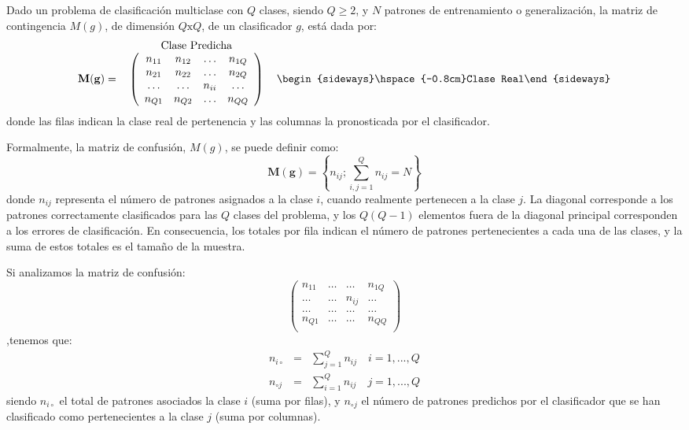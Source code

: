 Dado un problema de
clasificación multiclase con $Q$ clases, siendo $Q\geq2$, y $N$ patrones de entrenamiento
o generalización, la matriz de contingencia $M(g)$, de dimensión $Q\text{x}Q$, de un
clasificador $g$, está dada por:
\begin{displaymath}
\begin{tabular}{ccc}
&Clase Predicha & \\
$\mathbf{M(g)}=$ &$\left( \begin{array}{cccc}
n_{11} & n_{12} & \ldots & n_{1Q} \\
n_{21} & n_{22} & \ldots & n_{2Q} \\
\ldots & \ldots & n_{ii} & \ldots \\
n_{Q1} & n_{Q2} & \ldots & n_{QQ} \\
\end{array} \right)$ & \begin{sideways}\hspace{-0.8cm}Clase
Real\end{sideways} \\
\end{tabular}
\end{displaymath}
donde las filas indican la clase real de pertenencia y las columnas la pronosticada
por el clasificador.

Formalmente,  la matriz de confusión, $M(g)$, se puede definir como:
\begin{displaymath}
	 \mathbf{M(g)}=\left\{n_{ij};\sum_{i,j=1}^Q n_{ij}=N\right\}
\end{displaymath}
donde $n_{ij}$ representa el número de patrones asignados a la clase $i$, cuando
realmente pertenecen a la clase $j$. La diagonal corresponde a los patrones correctamente
clasificados para las $Q$ clases del problema, y los   $Q(Q-1)$	elementos fuera de la
diagonal principal corresponden a los errores de clasificación. En consecuencia, los
totales por fila indican
el número de patrones pertenecientes a cada una de las clases, y la suma de estos totales
es el tamaño de la muestra.

Si analizamos la matriz de confusión:
\begin{displaymath}
\left( \begin{array}{cccc}
n_{11} & \ldots & \ldots & n_{1Q} \\
\ldots & \ldots & n_{ij} & \ldots \\
\ldots & \ldots & \ldots & \ldots \\
n_{Q1} & \ldots & \ldots & n_{QQ} \\
\end{array}\right)
\end{displaymath}
,tenemos que:
\begin{eqnarray}
n_{i\circ} & = & \sum_{j=1}^Q n_{ij} \quad i=1,...,Q \nonumber \\
n_{\circ j} & = & \sum_{i=1}^Q n_{ij} \quad j=1,...,Q \nonumber
\end{eqnarray}
siendo $n_{i\circ}$ el total de patrones asociados la clase $i$ (suma por filas), y
$n_{\circ j}$ el número
de patrones predichos por el clasificador que se han clasificado como pertenecientes a la
clase $j$ (suma por columnas).

